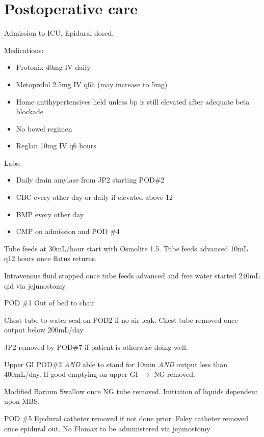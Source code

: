 \documentclass[
  letterpaper,
]{scrbook}
\providecommand{\tightlist}{%
  \setlength{\itemsep}{0pt}\setlength{\parskip}{0pt}}
\begin{document}
\section{Postoperative care}\label{postoperative-care-1}

Admission to ICU. Epidural dosed.

Medications:

\begin{itemize}
\tightlist
\item
  Protonix 40mg IV daily
\item
  Metoprolol 2.5mg IV q6h (may increase to 5mg)
\item
  Home antihypertensives held unless bp is still elevated after adequate
  beta blockade
\item
  No bowel regimen
\item
  Reglan 10mg IV q6 hours
\end{itemize}

Labs:

\begin{itemize}
\tightlist
\item
  Daily drain amylase from JP2 starting POD\#2
\item
  CBC every other day or daily if elevated above 12
\item
  BMP every other day
\item
  CMP on admission and POD \#4
\end{itemize}

Tube feeds at 30mL/hour start with Osmolite 1.5. Tube feeds advanced
10mL q12 hours once flatus returns.

Intravenous fluid stopped once tube feeds advanced and free water
started 240mL qid via jejunostomy.

POD \#1 Out of bed to chair

Chest tube to water seal on POD2 if no air leak. Chest tube removed once
output below 200mL/day

JP2 removed by POD\#7 if patient is otherwise doing well.

Upper GI POD\#2 \emph{AND} able to stand for 10min \emph{AND} output
less than 400mL/day. If good emptying on upper GI \(\rightarrow\) NG
removed.

Modified Barium Swallow once NG tube removed. Initiation of liquids
dependent upon MBS.

POD \#5 Epidural catheter removed if not done prior. Foley catheter
removed once epidural out. No Flomax to be administered via jejunostomy
\end{document}
